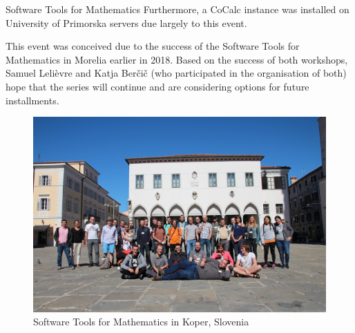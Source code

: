 \begin{event}{Software Tools for Mathematics}
Furthermore, a CoCalc instance was installed on University of Primorska servers
due largely to this event.

This event was conceived due to the success of the Software Tools for Mathematics
in Morelia earlier in 2018.
Based on the success of both workshops,
Samuel Leli\`{e}vre and Katja Ber\v{c}i\v{c} (who participated in the organisation of both)
hope that the series will continue and are considering options for future installments.

\begin{figure}[ht]
\includegraphics[scale=0.3]{stm-koper2019.jpeg}
\caption*{Software Tools for Mathematics in Koper, Slovenia}
\end{figure}



\end{event}

